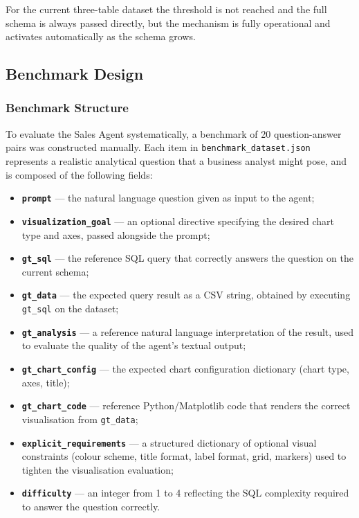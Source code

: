 \documentclass[11pt,a4paper]{article}
\begin{document}
For the current three-table dataset the threshold is not reached and the full
schema is always passed directly, but the mechanism is fully operational and
activates automatically as the schema grows.

\subsection{Benchmark Design}
\label{subsec:benchmark}

\subsubsection{Benchmark Structure}

To evaluate the Sales Agent systematically, a benchmark of 20 question-answer pairs
was constructed manually. Each item in \texttt{benchmark\_dataset.json} represents
a realistic analytical question that a business analyst might pose, and is composed
of the following fields:

\begin{itemize}
    \item \textbf{\texttt{prompt}} — the natural language question given as input
          to the agent;
    \item \textbf{\texttt{visualization\_goal}} — an optional directive specifying
          the desired chart type and axes, passed alongside the prompt;
    \item \textbf{\texttt{gt\_sql}} — the reference SQL query that correctly answers
          the question on the current schema;
    \item \textbf{\texttt{gt\_data}} — the expected query result as a CSV string,
          obtained by executing \texttt{gt\_sql} on the dataset;
    \item \textbf{\texttt{gt\_analysis}} — a reference natural language interpretation
          of the result, used to evaluate the quality of the agent's textual output;
    \item \textbf{\texttt{gt\_chart\_config}} — the expected chart configuration
          dictionary (chart type, axes, title);
    \item \textbf{\texttt{gt\_chart\_code}} — reference Python/Matplotlib code that
          renders the correct visualisation from \texttt{gt\_data};
    \item \textbf{\texttt{explicit\_requirements}} — a structured dictionary of
          optional visual constraints (colour scheme, title format, label format,
          grid, markers) used to tighten the visualisation evaluation;
    \item \textbf{\texttt{difficulty}} — an integer from 1 to 4 reflecting the SQL
          complexity required to answer the question correctly.
\end{itemize}
\end{document}
